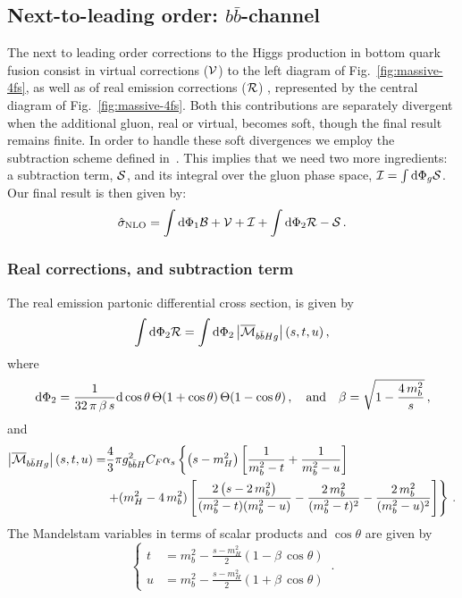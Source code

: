 \subsection{Next-to-leading order: $b\bar{b}$-channel}
The next to leading order corrections to the Higgs production in
bottom quark fusion consist in virtual corrections (${\cal V}$) to the
left diagram of Fig.~\ref{fig:massive-4fs}, as well as of real
emission corrections (${\cal R}$) , represented by the central diagram of
Fig.~\ref{fig:massive-4fs}.
Both this contributions are separately divergent when the additional
gluon, real or virtual, becomes soft, though the final result remains
finite. In order to handle these soft divergences we employ the
subtraction scheme defined in~\cite{Krauss:2017wmx}. This implies that
we need two more ingredients: a subtraction term, ${\cal S}$, and its
integral over the gluon phase space, ${\cal I} = \int{\rm d}\Phi_g{\cal S}$.
Our final result is then given by:
\begin{equation}
  \hat{\sigma}_{\rm NLO} = \int{\rm d}\Phi_1 {\cal B} +{\cal V}+{\cal
    I}+  \int{\rm d}\Phi_2 {\cal R} -{\cal S}\,.
\end{equation}

\subsubsection{Real corrections, and subtraction term}
The real emission partonic differential cross section, is given by
\begin{equation}
 \int {\rm d} \Phi_{2}  {\cal R} =\int {\rm d} \Phi_{2}  \left| \overline{{\cal M}}_{b\bar{b}Hg} \right|(s,t,u)\,,
\end{equation}
where 
\begin{equation}
  {\rm d} \Phi_{2}=\frac{1}{32\,\pi\,\beta\,s} {\rm d}\cos\theta\,
  \Theta(1+\cos\theta )\,\Theta(1-\cos\theta)\, , \quad{\rm and}\quad
  \beta=\sqrt{1-\frac{4\,m_b^2}{s}}\,,
\end{equation}
and
\begin{equation}
  \label{eq:real}
  \begin{split}
    \left| \overline{{\cal M}}_{b\bar{b}Hg} \right|(s,t,u) = &
    \frac{4}{3}\pi g_{b\bar{b}H}^2C_F\alpha_s
    \left\{
      \left( s-m_H^2\right)\left[ \frac{1}{m_b^2-t}
        + \frac{1}{m_b^2-u}\right]
    \right.\\
    &
    \left.+ (m_H^2-4\,m_b^2)
      \left[
        \frac{2\left( s-2\,m_b^2 \right)}{(m_b^2-t)(m_b^2-u)} -
        \frac{2\,m_b^2}{(m_b^2-t)^2} -
        \frac{2\,m_b^2}{(m_b^2-u)^2}
      \right]
    \right\}\,.
  \end{split}
\end{equation}
The Mandelstam variables in terms of scalar
products and $\cos\theta$ are given by
\begin{equation}
  \left\{
    \begin{split}
      t &= m_b^2 - \frac{s-m_H^2}{2}\left( 1-\beta\,\cos\theta\right)\\
      u &= m_b^2 - \frac{s-m_H^2}{2}\left( 1+\beta\,\cos\theta\right) 
    \end{split}
  \right.\,.
\end{equation}

